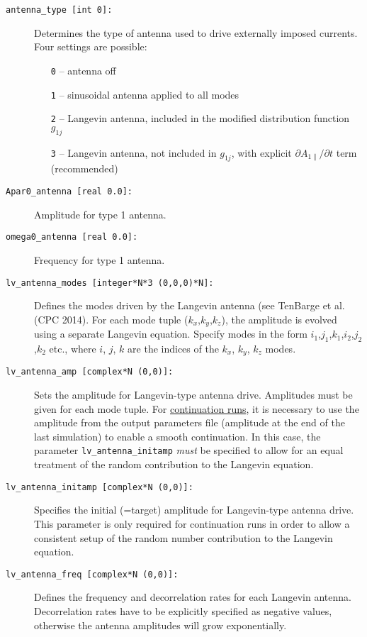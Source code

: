 \documentclass[12pt]{article}
\begin{document}
\begin{description}
\item[\hypertarget{antenna_type}{\tt antenna\_type [int 0]:}] Determines the type of antenna used to
drive externally imposed currents. Four settings are possible:
\begin{itemize}
\item[{\tt 0}] -- antenna off
\item[{\tt 1}] -- sinusoidal antenna applied to all modes
\item[{\tt 2}] -- Langevin antenna, included in the modified distribution function $g_{1j}$
\item[{\tt 3}] -- Langevin antenna, not included in $g_{1j}$, with explicit $\partial A_{1\|}/\partial t$ term (recommended)
\end{itemize}
\item[\hypertarget{Apar0_antenna}{\tt Apar0\_antenna [real 0.0]:}] Amplitude for type 1 antenna.
\item[\hypertarget{omega0_antenna}{\tt omega0\_antenna [real 0.0]:}] Frequency for type 1 antenna.
\item[\hypertarget{lv_antenna_modes}{\tt lv\_antenna\_modes [integer*N*3 (0,0,0)*N]:}] Defines the
modes driven by the Langevin antenna (see TenBarge et al. (CPC 2014). For each mode tuple ($k_x$,$k_y$,$k_z$),
the amplitude is evolved using a separate Langevin equation. Specify modes in the form
$i_1$,$j_1$,$k_1$,$i_2$,$j_2$,$k_2$ etc., where $i$, $j$, $k$ are the indices of the $k_x$, $k_y$, $k_z$ modes.
\item[\hypertarget{lv_antenna_amp}{\tt lv\_antenna\_amp [complex*N (0,0)]:}] Sets the amplitude for
Langevin-type antenna drive. Amplitudes must be given for each mode tuple. For \hyperref[subsubsec:continue_sim]{continuation runs}, it is
necessary to use the amplitude from the output parameters file (amplitude at the end of the last simulation)
to enable a smooth continuation. In this case, the parameter {\tt lv\_antenna\_initamp} {\em must} be
specified to allow for an equal treatment of the random contribution to the Langevin equation.
\item[\hypertarget{lv_antenna_initamp}{\tt lv\_antenna\_initamp [complex*N (0,0)]:}] Specifies the initial
(=target) amplitude for Langevin-type antenna drive. This parameter is only required for continuation runs in order
to allow a consistent setup of the random number contribution to the Langevin equation.
\item[\hypertarget{lv_antenna_freq}{\tt lv\_antenna\_freq [complex*N (0,0)]:}] Defines the frequency and
decorrelation rates for each Langevin antenna. Decorrelation rates have to be explicitly specified as
negative values, otherwise the antenna amplitudes will grow exponentially.
\end{description}
\end{document}
